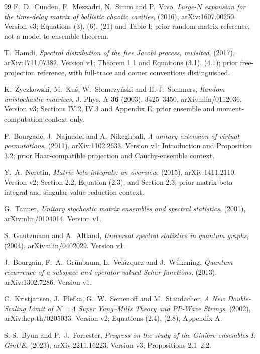 \begin{thebibliography}{99}
F.~D.~Cunden, F.~Mezzadri, N.~Simm and P.~Vivo,
\emph{Large-$N$ expansion for the time-delay matrix of ballistic chaotic cavities},
(2016),
arXiv:1607.00250.
Version v3; Equations (3), (6), (21) and Table I; prior random-matrix reference, not a model-to-ensemble theorem.

T.~Hamdi,
\emph{Spectral distribution of the free Jacobi process, revisited},
(2017),
arXiv:1711.07382.
Version v1; Theorem 1.1 and Equations (3.1), (4.1); prior free-projection reference, with full-trace and corner conventions distinguished.

K.~\.Zyczkowski, M.~Ku\'s, W.~S{\l}omczy\'nski and H.-J.~Sommers,
\emph{Random unistochastic matrices},
J. Phys. A \textbf{36} (2003), 3425--3450,
arXiv:nlin/0112036.
Version v3; Sections IV.2, IV.3 and Appendix E; prior ensemble and moment-computation context only.

P.~Bourgade, J.~Najnudel and A.~Nikeghbali,
\emph{A unitary extension of virtual permutations},
(2011),
arXiv:1102.2633.
Version v1; Introduction and Proposition 3.2; prior Haar-compatible projection and Cauchy-ensemble context.

Y.~A.~Neretin,
\emph{Matrix beta-integrals: an overview},
(2015),
arXiv:1411.2110.
Version v2; Section 2.2, Equation (2.3), and Section 2.3; prior matrix-beta integral and singular-value reduction context.

G.~Tanner,
\emph{Unitary stochastic matrix ensembles and spectral statistics},
(2001),
arXiv:nlin/0104014.
Version v1.

S.~Gnutzmann and A.~Altland,
\emph{Universal spectral statistics in quantum graphs},
(2004),
arXiv:nlin/0402029.
Version v1.

J.~Bourgain, F.~A.~Gr\"unbaum, L.~Vel\'azquez and J.~Wilkening,
\emph{Quantum recurrence of a subspace and operator-valued Schur functions},
(2013),
arXiv:1302.7286.
Version v1.

C.~Kristjansen, J.~Plefka, G.~W.~Semenoff and M.~Staudacher,
\emph{A New Double-Scaling Limit of $\mathcal N=4$ Super Yang--Mills Theory and PP-Wave Strings},
(2002),
arXiv:hep-th/0205033.
Version v2; Equations (2.4), (2.8), Appendix A.

S.-S.~Byun and P.~J.~Forrester,
\emph{Progress on the study of the Ginibre ensembles I: GinUE},
(2023),
arXiv:2211.16223.
Version v3; Propositions 2.1--2.2.


\end{thebibliography}
